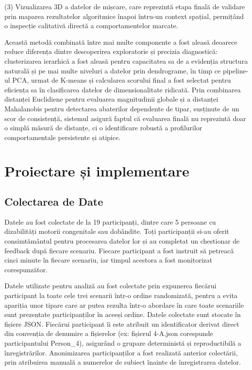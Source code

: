 \documentclass[12pt,a4paper]{report}
\theoremstyle{definition}
\theoremstyle{remark}
\begin{document}
(3) Vizualizarea 3D a datelor de mișcare, care reprezintă etapa finală de validare prin maparea rezultatelor algoritmice înapoi întru-un context spațial, permițând o inspecție calitativă directă a comportamentelor marcate. 

Această metodă combinată între mai multe componente a fost aleasă deoarece reduce diferența dintre descoperirea exploratorie și precizia diagnostică: clusterizarea ierarhică a fost aleasă pentru capacitatea sa de a evidenția structura naturală și pe mai multe niveluri a datelor prin dendrograme, în timp ce pipeline-ul PCA, urmat de K-means și calcularea scorului final a fost selectat pentru eficiența sa în clasificarea datelor de dimensionalitate ridicată. Prin combinarea distanței Euclidiene pentru evaluarea magnitudinii globale și a distanței Mahalanobis pentru detectarea abaterilor dependente de tipar, susținute de un scor de consistență, sistemul asigură faptul că evaluarea finală nu reprezintă doar o simplă măsură de distanțe, ci o identificare robustă a profilurilor comportamentale persistente și atipice. 


\section{Proiectare și implementare}

\subsection{Colectarea de Date}

Datele au fost colectate de la 19 participanți, dintre care 5 persoane cu dizabilități motorii congenitale sau dobândite. Toți participanții si-au oferit consimtământul pentru procesarea datelor lor și au completat un chestionar de feedback după fiecare scenariu. Fiecare participant a fost instruit să petreacă cinci minute în fiecare scenariu, iar timpul acestora a fost monitorizat corespunzător.

Datele utilizate pentru analiză au fost colectate prin expunerea fiecărui participant la toate cele trei scenarii într-o ordine randomizată, pentru a evita apariția unor tipare care ar putea rezulta într-o abordare în care toate scenariile sunt prezentate participanților în aceeși ordine. Datele colectate sunt stocate în fișiere JSON. Fiecărui participant îi este atribuit un identificator derivat direct din convenția de denumire a fișierelor (ex: fișierul 4-A.json corespunde participantului Person\_4), asigurând o grupare deterministă și reproductibilă a înregistrărilor. Anonimizarea participanților a fost realizată anterior colectării, prin atribuirea manuală a numerelor de subiect înainte de înregistrarea datelor.
\end{document}
